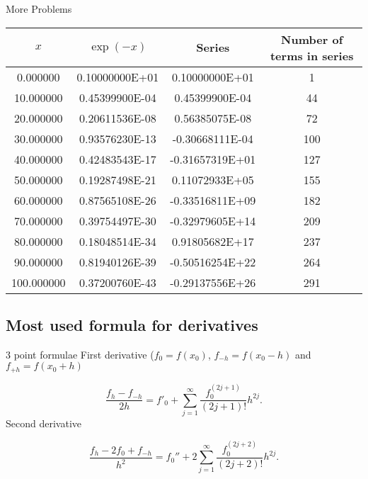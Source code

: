 \documentclass[%
oneside,                 %
final,                   %
10pt]{article}
\begin{document}
\begin{block}{More Problems }


{\footnotesize
\begin{tabular}{cccc}
\hline
\multicolumn{1}{c}{ $x$ } & \multicolumn{1}{c}{ $\exp{(-x)}$ } & \multicolumn{1}{c}{ Series } & \multicolumn{1}{c}{ Number of terms in series } \\
\hline
0.000000   & 0.10000000E+01 & 0.10000000E+01  & 1                         \\
10.000000  & 0.45399900E-04 & 0.45399900E-04  & 44                        \\
20.000000  & 0.20611536E-08 & 0.56385075E-08  & 72                        \\
30.000000  & 0.93576230E-13 & -0.30668111E-04 & 100                       \\
40.000000  & 0.42483543E-17 & -0.31657319E+01 & 127                       \\
50.000000  & 0.19287498E-21 & 0.11072933E+05  & 155                       \\
60.000000  & 0.87565108E-26 & -0.33516811E+09 & 182                       \\
70.000000  & 0.39754497E-30 & -0.32979605E+14 & 209                       \\
80.000000  & 0.18048514E-34 & 0.91805682E+17  & 237                       \\
90.000000  & 0.81940126E-39 & -0.50516254E+22 & 264                       \\
100.000000 & 0.37200760E-43 & -0.29137556E+26 & 291                       \\
\hline
\end{tabular}
}

\noindent
\end{block}

\subsection{Most used formula for derivatives}

\begin{block}{3 point formulae }
First derivative  ($f_0 = f(x_0)$, $f_{-h}=f(x_0-h)$ and $f_{+h}=f(x_0+h)$

\[
   \frac{f_h-f_{-h}}{2h}=f'_0+\sum_{j=1}^{\infty}\frac{f_0^{(2j+1)}}{(2j+1)!}h^{2j}.
\]
Second derivative

\[
 \frac{ f_h -2f_0 +f_{-h}}{h^2}=f_0''+2\sum_{j=1}^{\infty}\frac{f_0^{(2j+2)}}{(2j+2)!}h^{2j}.
\]
\end{block}
\end{document}
